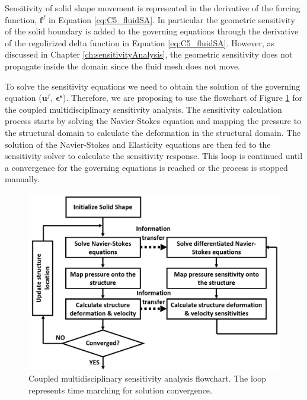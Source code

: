 %
Sensitivity of solid shape movement is represented in the derivative of the forcing function, $\mathbf{f}^f$ in Equation \eqref{eq:C5_fluidSA}. In particular the geometric sensitivity of the solid boundary is added to the governing equations through the derivative of the regulirized delta function in Equation \eqref{eq:C5_fluidSA}. However, as discussed in Chapter \ref{ch:sensitivityAnalysis}, the geometric sensitivity does not propagate inside the domain since the fluid mesh does not move.

To solve the sensitivity equations we need to obtain the solution of the governing equation ($\mathbf{u}^f$, $\mathbf{\epsilon^s}$). Therefore, we are proposing to use the flowchart of Figure \ref{fig:C5_SAflowchart} for the coupled multidisciplinary sensitivity analysis. The sensitivity calculation process starts by solving the Navier-Stokes equation and mapping the pressure to the structural domain to calculate the deformation in the structural domain. The solution of the Navier-Stokes and Elasticity equations are then fed to the sensitivity solver to calculate the sensitivity response. This loop is continued until a convergence for the governing equations is reached or the process is stopped manually. 
%
\begin{figure}[H]
    \centering
    \includegraphics[width=14.00cm]{Chapter_5/figure/couple_SA_flowchart.jpg}
    \caption{Coupled multidisciplinary sensitivity analysis flowchart. The loop represents time marching for solution convergence.}
    \label{fig:C5_SAflowchart}
\end{figure}
%